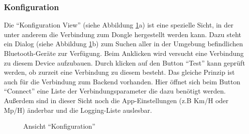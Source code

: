 \subsubsection{Konfiguration}
\label{sec:appSichtKonfiguration}

Die \enquote{Konfiguration View} (siehe Abbildung \ref{fig:APP_Configuration}a) ist eine spezielle Sicht, in der unter anderem die Verbindung zum Dongle hergestellt werden kann. Dazu steht ein Dialog (siehe Abbildung \ref{fig:APP_Configuration}b) zum Suchen aller in der Umgebung befindlichen Bluetooth-Geräte zur Verfügung. Beim Anklicken wird versucht eine Verbindung zu diesem Device aufzubauen. Durch klicken auf den Button \enquote{Test} kann geprüft werden, ob zurzeit eine Verbindung zu diesem besteht. Das gleiche Prinzip ist auch für die Verbindung zum Backend vorhanden. Hier öffnet sich beim Button \enquote{Connect} eine Liste der Verbindungsparameter die dazu benötigt werden. Außerdem sind in dieser Sicht noch die App-Einstellungen (z.B Km/H oder Mp/H) änderbar und die Logging-Liste auslesbar.

\begin{figure}[H]
	\centering 
    \label{fig:APP_Configuration_View}
    \hspace{1cm}
	\label{fig:App_Bluetooth_Search}
	\caption{Ansicht \enquote{Konfiguration}}
	\label{fig:APP_Configuration}
\end{figure}

